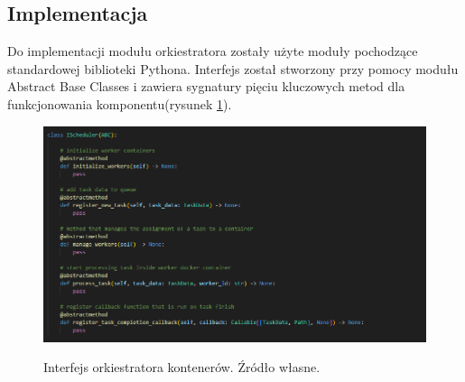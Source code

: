 \subsection{Implementacja}
Do implementacji modułu orkiestratora zostały użyte moduły pochodzące standardowej biblioteki Pythona. Interfejs został stworzony przy pomocy modułu Abstract Base Classes\cite{pythonAbc} i zawiera sygnatury pięciu kluczowych metod dla funkcjonowania komponentu(rysunek \ref{fig:scheduler-interface}). 
\begin{figure}[!ht]
	\begin{center}
		\resizebox{1\textwidth}{!} {
			\includegraphics{img/3/orkiestrator-kontenerow-interface.png}
		}
		\caption{Interfejs orkiestratora kontenerów. Źródło własne.}
		\label{fig:scheduler-interface}
	\end{center}
\end{figure}

